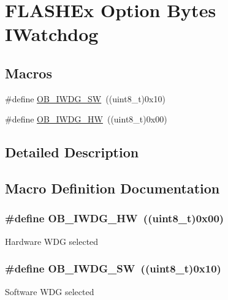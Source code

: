 \hypertarget{group___f_l_a_s_h_ex___option___bytes___i_watchdog}{\section{F\-L\-A\-S\-H\-Ex Option Bytes I\-Watchdog}
\label{group___f_l_a_s_h_ex___option___bytes___i_watchdog}
}
\subsection*{Macros}
\begin{DoxyCompactItemize}
\item 
\#define \hyperlink{group___f_l_a_s_h_ex___option___bytes___i_watchdog_ga5a357e232c955444c3f2ccb9a937ffce}{O\-B\-\_\-\-I\-W\-D\-G\-\_\-\-S\-W}~((uint8\-\_\-t)0x10)
\item 
\#define \hyperlink{group___f_l_a_s_h_ex___option___bytes___i_watchdog_gadfcbfa963d79c339ec8e2d5a7734e47a}{O\-B\-\_\-\-I\-W\-D\-G\-\_\-\-H\-W}~((uint8\-\_\-t)0x00)
\end{DoxyCompactItemize}


\subsection{Detailed Description}


\subsection{Macro Definition Documentation}
\hypertarget{group___f_l_a_s_h_ex___option___bytes___i_watchdog_gadfcbfa963d79c339ec8e2d5a7734e47a}{
\subsubsection[{O\-B\-\_\-\-I\-W\-D\-G\-\_\-\-H\-W}]{\setlength{\rightskip}{0pt plus 5cm}\#define O\-B\-\_\-\-I\-W\-D\-G\-\_\-\-H\-W~((uint8\-\_\-t)0x00)}}\label{group___f_l_a_s_h_ex___option___bytes___i_watchdog_gadfcbfa963d79c339ec8e2d5a7734e47a}
Hardware W\-D\-G selected \hypertarget{group___f_l_a_s_h_ex___option___bytes___i_watchdog_ga5a357e232c955444c3f2ccb9a937ffce}{
\subsubsection[{O\-B\-\_\-\-I\-W\-D\-G\-\_\-\-S\-W}]{\setlength{\rightskip}{0pt plus 5cm}\#define O\-B\-\_\-\-I\-W\-D\-G\-\_\-\-S\-W~((uint8\-\_\-t)0x10)}}\label{group___f_l_a_s_h_ex___option___bytes___i_watchdog_ga5a357e232c955444c3f2ccb9a937ffce}
Software W\-D\-G selected 